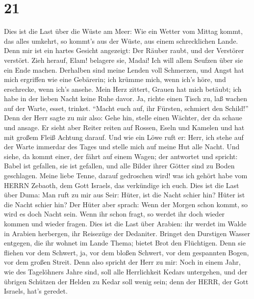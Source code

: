 \hypertarget{section-20}{%
\section{21}\label{section-20}}

 Dies ist die Last über die Wüste am Meer: Wie ein Wetter
vom Mittag kommt, das alles umkehrt, so kommt's aus der Wüste, aus einem
schrecklichen Lande.  Denn mir ist ein hartes Gesicht
angezeigt: Der Räuber raubt, und der Verstörer verstört. Zieh herauf,
Elam! belagere sie, Madai! Ich will allem Seufzen über sie ein Ende
machen.  Derhalben sind meine Lenden voll Schmerzen, und
Angst hat mich ergriffen wie eine Gebärerin; ich krümme mich, wenn ich's
höre, und erschrecke, wenn ich's ansehe.  Mein Herz zittert,
Grauen hat mich betäubt; ich habe in der lieben Nacht keine Ruhe davor.
 Ja, richte einen Tisch zu, laß wachen auf der Warte, esset,
trinket. ``Macht euch auf, ihr Fürsten, schmiert den Schild!''
 Denn der Herr sagte zu mir also: Gehe hin, stelle einen
Wächter, der da schaue und ansage.  Er sieht aber Reiter
reiten auf Rossen, Eseln und Kamelen und hat mit großem Fleiß Achtung
darauf.  Und wie ein Löwe ruft er: Herr, ich stehe auf der
Warte immerdar des Tages und stelle mich auf meine Hut alle Nacht.
 Und siehe, da kommt einer, der fährt auf einem Wagen; der
antwortet und spricht: Babel ist gefallen, sie ist gefallen, und alle
Bilder ihrer Götter sind zu Boden geschlagen.  Meine liebe
Tenne, darauf gedroschen wird! was ich gehört habe vom HERRN Zebaoth,
dem Gott Israels, das verkündige ich euch.  Dies ist die
Last über Duma: Man ruft zu mir aus Seir: Hüter, ist die Nacht schier
hin? Hüter ist die Nacht schier hin?  Der Hüter aber
sprach: Wenn der Morgen schon kommt, so wird es doch Nacht sein. Wenn
ihr schon fragt, so werdet ihr doch wieder kommen und wieder fragen.
 Dies ist die Last über Arabien: ihr werdet im Walde in
Arabien herbergen, ihr Reisezüge der Dedaniter.  Bringet
den Durstigen Wasser entgegen, die ihr wohnet im Lande Thema; bietet
Brot den Flüchtigen.  Denn sie fliehen vor dem Schwert, ja,
vor dem bloßen Schwert, vor dem gespannten Bogen, vor dem großen Streit.
 Denn also spricht der Herr zu mir: Noch in einem Jahr, wie
des Tagelöhners Jahre sind, soll alle Herrlichkeit Kedars untergehen,
 und der übrigen Schützen der Helden zu Kedar soll wenig
sein; denn der HERR, der Gott Israels, hat's geredet.

